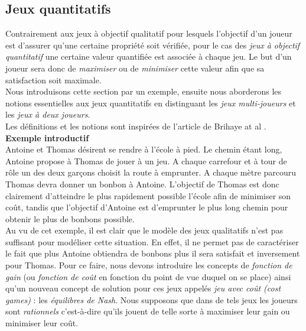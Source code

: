 
\subsection{Jeux quantitatifs }

Contrairement aux jeux à objectif qualitatif pour lesquels l'objectif d'un joueur est d'assurer qu'une certaine propriété soit vérifiée, pour le cas des \textit{jeux à objectif quantitatif} une certaine valeur quantifiée est associée à chaque jeu. Le but d'un joueur sera donc de \textit{maximiser} ou de \textit{minimiser} cette valeur afin que sa satisfaction soit maximale.\\

Nous introduisons cette section par un exemple, ensuite nous aborderons les notions essentielles aux jeux quantitatifs en distinguant les \textit{jeux multi-joueurs} et les \textit{jeux à deux joueurs}.\\
Les définitions et les notions sont inspirées de l'article de Brihaye at al \cite{DBLP:conf/lfcs/BrihayePS13}.\\

\noindent\textbf {Exemple introductif} \\
\indent Antoine et Thomas désirent se rendre à l'école à pied. Le chemin étant long, Antoine propose à Thomas de jouer à un jeu. A chaque carrefour et à tour de rôle un des deux garçons choisit la route à emprunter. A chaque mètre parcouru Thomas devra donner un bonbon à Antoine. L'objectif de Thomas est donc clairement d'atteindre le plus rapidement possible l'école afin de minimiser son coût, tandis que l'objectif d'Antoine est d'emprunter le plus long chemin pour obtenir le plus de bonbons possible.\\

Au vu de cet exemple, il est clair que le modèle des jeux qualitatifs n'est pas suffisant pour modéliser cette situation. En effet, il ne permet pas de caractériser le fait que plus Antoine obtiendra de bonbons plus il sera satisfait et inversement pour Thomas. Pour ce faire, nous devons introduire les concepts de \textit{fonction de gain} (ou \textit{fonction de coût} en fonction du point de vue duquel on se place) ainsi qu'un nouveau concept de solution pour ces jeux appelés \textit{jeu avec coût (cost games)} : les \textit{équilibres de Nash}. Nous supposons que dans de tels jeux les joueurs sont \textit{rationnels} c'est-à-dire qu'ils jouent de telle sorte à maximiser leur gain ou minimiser leur coût.\\



